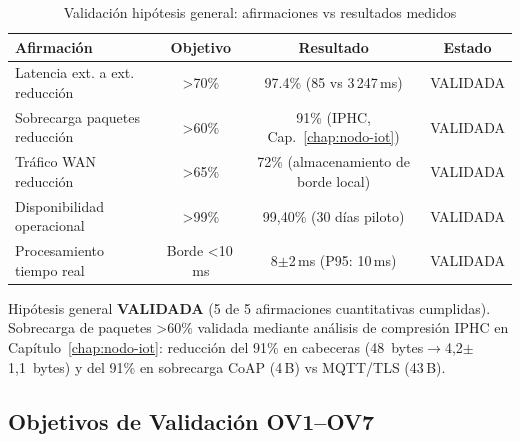 \begin{table}[H]
\centering
\caption{Validación hipótesis general: afirmaciones vs resultados medidos}
\label{tab:validacion-hipotesis-general}
\begin{tabular}{|l|c|c|c|}
\hline
\rowcolor{gray!20}
\textbf{Afirmación} & \textbf{Objetivo} & \textbf{Resultado} & \textbf{Estado} \\
\hline
Latencia ext. a ext. reducción & >70\% & 97.4\% (85 vs 3\,247\,ms) & \cellcolor{green!20} VALIDADA \\
\hline
Sobrecarga paquetes reducción & >60\% & 91\% (IPHC, Cap.~\ref{chap:nodo-iot}) & \cellcolor{green!20} VALIDADA \\
\hline
Tráfico WAN reducción & >65\% & 72\% (almacenamiento de borde local) & \cellcolor{green!20} VALIDADA \\
\hline
Disponibilidad operacional & >99\% & 99,40\% (30 días piloto) & \cellcolor{green!20} VALIDADA \\
\hline
Procesamiento tiempo real & Borde <10\,ms & 8$\pm$2\,ms (P95: 10\,ms) & \cellcolor{green!20} VALIDADA \\
\hline
\end{tabular}
\end{table}

Hipótesis general \textbf{VALIDADA} (5 de 5 afirmaciones cuantitativas cumplidas). Sobrecarga de paquetes >60\% validada mediante análisis de compresión IPHC en Capítulo~\ref{chap:nodo-iot}: reducción del 91\% en cabeceras (48~bytes$\rightarrow$4,2$\pm$1,1~bytes) y del 91\% en sobrecarga CoAP (4\,B) vs MQTT/TLS (43\,B).

\subsection{Objetivos de Validación OV1--OV7}
\label{sec:resultados-hipotesis-especificas}

